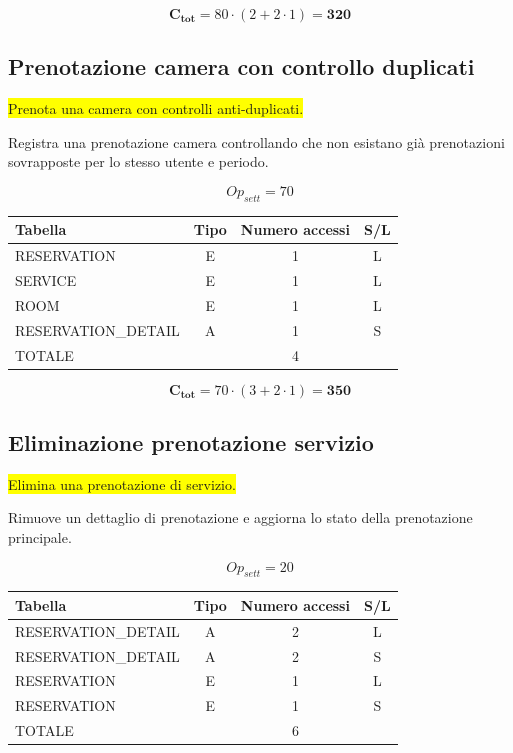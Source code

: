\documentclass[a4paper,12pt]{report}
\begin{document}
$$\mathbf{C_{tot}} = 80 \cdot (2 + 2 \cdot 1) = \mathbf{320}$$

\subsection*{Prenotazione camera con controllo duplicati} \label{op15}
\colorbox{yellow}{Prenota una camera con controlli anti-duplicati.}

Registra una prenotazione camera controllando che non esistano già
prenotazioni sovrapposte per lo stesso utente e periodo.

$$Op_{sett} = 70$$

\begin{table}[H]
  \centering
  \small
  \renewcommand{\arraystretch}{1.15}
  \begin{tabularx}{0.8\textwidth}{|X|c|c|c|}
    \hline
    \rowcolor{gray!20}
    \textbf{Tabella} & \textbf{Tipo} & \textbf{Numero accessi} & \textbf{S/L} \\
    \hline
    RESERVATION & E & 1 & L \\
    SERVICE & E & 1 & L \\
    ROOM & E & 1 & L \\
    RESERVATION\_DETAIL & A & 1 & S \\
    \hline
    \rowcolor{gray!20}
    TOTALE & & 4 & \\
    \hline
  \end{tabularx}
  \vspace{-1em}
\end{table}

$$\mathbf{C_{tot}} = 70 \cdot (3 + 2 \cdot 1) = \mathbf{350}$$

\subsection*{Eliminazione prenotazione servizio} \label{op16}
\colorbox{yellow}{Elimina una prenotazione di servizio.}

Rimuove un dettaglio di prenotazione e aggiorna lo stato della
prenotazione principale.

$$Op_{sett} = 20$$

\begin{table}[H]
  \centering
  \small
  \renewcommand{\arraystretch}{1.15}
  \begin{tabularx}{0.8\textwidth}{|X|c|c|c|}
    \hline
    \rowcolor{gray!20}
    \textbf{Tabella} & \textbf{Tipo} & \textbf{Numero accessi} & \textbf{S/L} \\
    \hline
    RESERVATION\_DETAIL & A & 2 & L \\
    RESERVATION\_DETAIL & A & 2 & S \\
    RESERVATION & E & 1 & L \\
    RESERVATION & E & 1 & S \\
    \hline
    \rowcolor{gray!20}
    TOTALE & & 6 & \\
    \hline
  \end{tabularx}
  \vspace{-1em}
\end{table}
\end{document}
